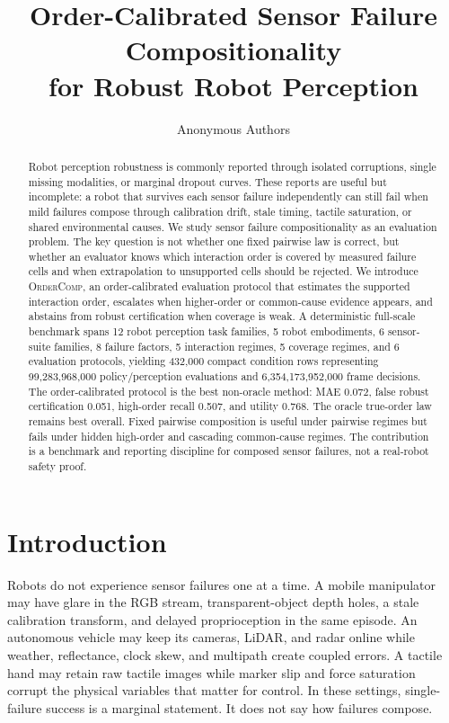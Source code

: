 \documentclass{article}
\title{Order-Calibrated Sensor Failure\\Compositionality\\for Robust Robot Perception}
\author{Anonymous Authors}
\newcommand{\method}{\textsc{OrderComp}}
\begin{document}
\maketitle

\begin{abstract}
Robot perception robustness is commonly reported through isolated corruptions, single missing modalities, or marginal dropout curves. These reports are useful but incomplete: a robot that survives each sensor failure independently can still fail when mild failures compose through calibration drift, stale timing, tactile saturation, or shared environmental causes. We study sensor failure compositionality as an evaluation problem. The key question is not whether one fixed pairwise law is correct, but whether an evaluator knows which interaction order is covered by measured failure cells and when extrapolation to unsupported cells should be rejected. We introduce \method, an order-calibrated evaluation protocol that estimates the supported interaction order, escalates when higher-order or common-cause evidence appears, and abstains from robust certification when coverage is weak. A deterministic full-scale benchmark spans 12 robot perception task families, 5 robot embodiments, 6 sensor-suite families, 8 failure factors, 5 interaction regimes, 5 coverage regimes, and 6 evaluation protocols, yielding 432,000 compact condition rows representing 99,283,968,000 policy/perception evaluations and 6,354,173,952,000 frame decisions. The order-calibrated protocol is the best non-oracle method: MAE 0.072, false robust certification 0.051, high-order recall 0.507, and utility 0.768. The oracle true-order law remains best overall. Fixed pairwise composition is useful under pairwise regimes but fails under hidden high-order and cascading common-cause regimes. The contribution is a benchmark and reporting discipline for composed sensor failures, not a real-robot safety proof.
\end{abstract}

\section{Introduction}

Robots do not experience sensor failures one at a time. A mobile manipulator may have glare in the RGB stream, transparent-object depth holes, a stale calibration transform, and delayed proprioception in the same episode. An autonomous vehicle may keep its cameras, LiDAR, and radar online while weather, reflectance, clock skew, and multipath create coupled errors. A tactile hand may retain raw tactile images while marker slip and force saturation corrupt the physical variables that matter for control. In these settings, single-failure success is a marginal statement. It does not say how failures compose.
\end{document}
